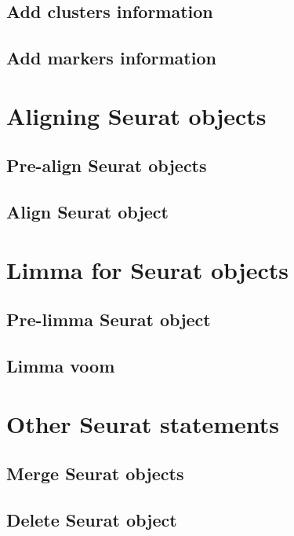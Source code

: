 \subsection{Add clusters information}
\subsection{Add markers information}

\section{Aligning Seurat objects}
\subsection{Pre-align Seurat objects}
\subsection{Align Seurat object}

\section{Limma for Seurat objects}\label{sec:LimmaSeurat}
\subsection{Pre-limma Seurat object}
\subsection{Limma voom}

\section{Other Seurat statements}\label{sec:OtherSeuratStatements}
\subsection{Merge Seurat objects}
\subsection{Delete Seurat object}

